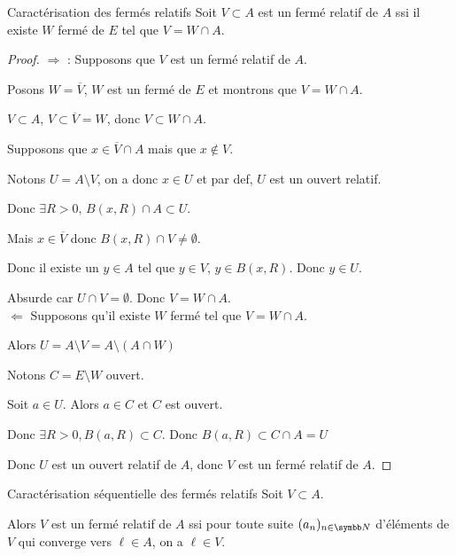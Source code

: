 \begin{proposition}{Caractérisation des fermés relatifs}{}
    Soit $V \subset A$ est un fermé relatif de $A$ ssi il existe $W$ fermé de $E$ tel que $V = W \cap A$.
\end{proposition}


\begin{proof}
    $\Rightarrow$ : Supposons que $V$ est un fermé relatif de $A$.

    Posons $W = \overline{V}$, $W$ est un fermé de $E$ et montrons que $V = W \cap A$.

    $V \subset A$, $V \subset \overline V = W$, donc $V \subset W \cap A$.

    Supposons que $x \in \overline V \cap A$ mais que $x \not \in V$.

    Notons $U = A \setminus V$, on a donc $x \in U$ et par def, $U$ est un ouvert relatif. 

    Donc $\exists R > 0, \, B(x, R) \cap A \subset U$.

    Mais $x \in  \overline V$ donc $B(x, R) \cap V \neq \emptyset$.

    Donc il existe un $y \in A$ tel que $y \in V$, $y \in B(x, R)$. Donc $y \in U$.

    Absurde car $U \cap V = \emptyset$.
    Donc $V = W \cap A$. \\

    $\Leftarrow$ Supposons qu'il existe $W$ fermé tel que $V = W \cap A$. 

    Alors $U = A \setminus V = A \setminus (A \cap W)$

    Notons $C = E \setminus W$ ouvert.

    Soit $a \in U$. Alors $a \in C$ et $C$ est ouvert. 

    Donc $\exists R > 0, B(a, R) \subset C$.
    Donc $B(a, R) \subset C \cap A = U$ 

    Donc $U$ est un ouvert relatif de $A$, donc $V$ est un fermé relatif de $A$.
\end{proof}

\begin{proposition}{Caractérisation séquentielle des fermés relatifs}{}
    Soit $V \subset A$. 

    Alors $V$ est un fermé relatif de $A$ ssi pour toute suite $(a_n)_{n \in \N}$ d'éléments de $V$
    qui converge vers $\ell \in A$, on a $\ell \in V$.
\end{proposition}

